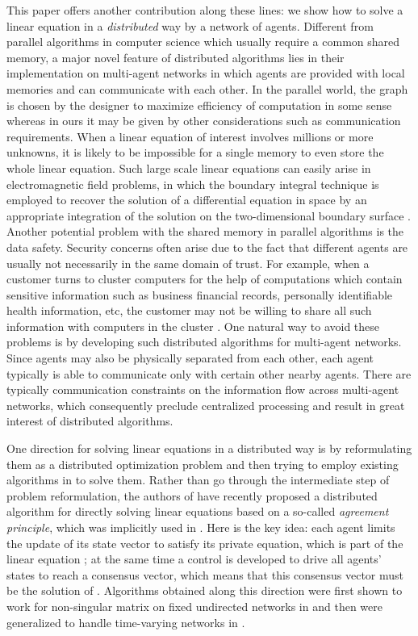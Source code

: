 \documentclass{aims}
\begin{document}
This paper offers another contribution along these lines: we show how
to solve a linear equation  in a \emph{distributed} way by a network of agents. Different from parallel algorithms in computer science  \cite{O96Cam,RJ05Cam,CAnd97Report} which usually require a common shared memory, a major novel feature of distributed algorithms lies in their implementation on multi-agent networks in which agents are provided with local memories and can communicate with each other. In the parallel world, the graph is chosen by the designer to maximize efficiency of computation in some sense whereas  in ours it may be given by other considerations such as communication requirements. When a linear equation of interest involves millions or more unknowns, it is likely to be impossible for a single memory to even store the whole linear equation. Such large scale linear equations can easily arise in electromagnetic field problems, in which the boundary integral technique is employed to recover the solution of a differential equation in space by an appropriate integration of the solution on the two-dimensional boundary surface \cite{Edelman93}. Another potential problem with the shared memory in parallel algorithms is the data safety. Security concerns often arise due to the fact that different agents are usually not necessarily in the same domain of trust. For example, when a customer turns to cluster computers for the help of computations which contain sensitive information such as business financial records, personally identifiable health information, etc, the customer may not be willing to share all such information with computers in the cluster \cite{CKJQ13TPD}. One natural way to avoid these problems is by developing such distributed algorithms for multi-agent networks. Since agents may also be physically separated from each other, each agent typically is  able to communicate only with certain other nearby agents. There are typically communication constraints on the information flow across multi-agent networks, which consequently preclude centralized processing and result in great interest of distributed algorithms.

One direction for solving linear equations in a distributed way is by reformulating them as a distributed optimization problem and then trying to employ existing algorithms in \cite{JAM12TAC,AA14TAC,DJJ14TAC,TAA14TAC} to solve them. Rather than go through the intermediate step of problem reformulation, the authors of \cite{SA13ECC,SJA13Allerton,SJA14TAC} have recently proposed a distributed algorithm for directly solving linear equations based on a so-called \emph{agreement principle}, which was implicitly used in \cite{AAP10TAC}. Here is the key idea: each agent limits the update of its state vector to satisfy its private equation, which is part of the linear equation ; at the same time a control is developed to drive all agents' states to reach a consensus vector, which means that this consensus vector must be the solution of .  Algorithms obtained along this direction were first shown to work for non-singular matrix  on fixed undirected networks in \cite{SA13ECC} and then were generalized to handle time-varying networks in \cite{SJA14TAC}.
\end{document}
